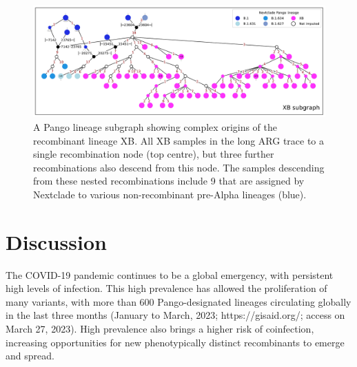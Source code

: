 \documentclass{article}
\begin{document}
\begin{figure} \centering
\includegraphics[width=\textwidth]{figures/Pango_XB_nxcld_tight_graph.pdf}
\caption{\label{fig:complex_origins_graph}  A Pango lineage subgraph showing
complex origins of the recombinant lineage XB. All XB samples in the long ARG
trace to a single recombination node (top centre), but three further recombinations
also descend from this node. The samples descending from these nested
recombinations include 9 that are assigned by Nextclade to
various non-recombinant pre-Alpha lineages (blue).}
\end{figure}




\section{Discussion}
The COVID-19 pandemic continues to be a global emergency,
with persistent high levels of infection. This high prevalence has allowed the
proliferation of many variants, with more than 600 Pango-designated lineages
circulating globally in the last three months (January to March, 2023;
https://gisaid.org/; access on March 27, 2023). High prevalence also brings a
higher risk of coinfection, increasing opportunities for new phenotypically
distinct recombinants to emerge and spread.
\end{document}
